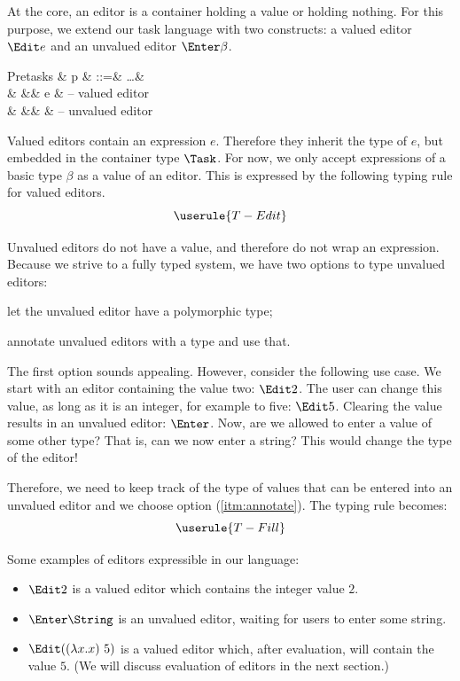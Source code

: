 At the core,
an editor is a container holding a value
or holding nothing.
For this purpose, we extend our task language with two constructs:
a valued editor $\Edit e$ and an unvalued editor $\Enter \beta$.
\begin{grammar}
  Pretasks
    & p & ::=& \ldots       & \\
    &   &\mid& \Edit e      & – valued editor \\
    &   &\mid& \Enter \beta & – unvalued editor \\
\end{grammar}

Valued editors contain an expression $e$.
Therefore they inherit the type of $e$,
but embedded in the container type $\Task$.
For now, we only accept expressions of a basic type $\beta$ as a value of an editor.
This is expressed by the following typing rule for valued editors.
\begin{equation*}
  \userule{T-Edit}
\end{equation*}

Unvalued editors do not have a value,
and therefore do not wrap an expression.
Because we strive to a fully typed system,
we have two options to type unvalued editors:
\begin{enumerate*}
  \item let the unvalued editor have a polymorphic type;
  \item annotate unvalued editors with a type and use that. \label{itm:annotate}
\end{enumerate*}

The first option sounds appealing.
However, consider the following use case.
We start with an editor containing the value two: $\Edit 2$.
The user can change this value, as long as it is an integer,
for example to five: $\Edit 5$.
Clearing the value results in an unvalued editor: $\Enter$.
Now, are we allowed to enter a value of some other type?
That is, can we now enter a string?
This would change the type of the editor!

Therefore,
we need to keep track of the type of values that can be entered into an unvalued editor
and we choose option (\ref{itm:annotate}).
The typing rule becomes:
\begin{equation*}
  \userule{T-Fill}
\end{equation*}

Some examples of editors expressible in our language:
\begin{itemize}
  \item $\Edit 2$ is a valued editor which contains the integer value $2$.
  \item $\Enter \String$ is an unvalued editor,
    waiting for users to enter some string.
  \item $\Edit ((\lambda x . x)\ 5)$ is a valued editor which,
    after evaluation, will contain the value $5$.
    (We will discuss evaluation of editors in the next section.)
\end{itemize}


